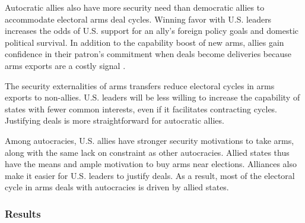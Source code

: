 \documentclass[12pt]{article}
\begin{document}
Autocratic allies also have more security need than democratic allies to accommodate electoral arms deal cycles. 
Winning favor with U.S. leaders increases the odds of U.S. support for an ally's foreign policy goals and domestic political survival.  
In addition to the capability boost of new arms, allies gain confidence in their patron's commitment when deals become deliveries because arms exports are a costly signal \citep{McManusYarhi-Milo2017}.


The security externalities of arms transfers reduce electoral cycles in arms exports to non-allies. 
U.S. leaders will be less willing to increase the capability of states with fewer common interests, even if it facilitates contracting cycles.
Justifying deals is more straightforward for autocratic allies. 







Among autocracies, U.S. allies have stronger security motivations to take arms, along with the same lack on constraint as other autocracies. 
Allied states thus have the means and ample motivation to buy arms near elections. 
Alliances also make it easier for U.S. leaders to justify deals.
As a result, most of the electoral cycle in arms deals with autocracies is driven by allied states. 
 

 
\subsubsection{Results}
\end{document}
